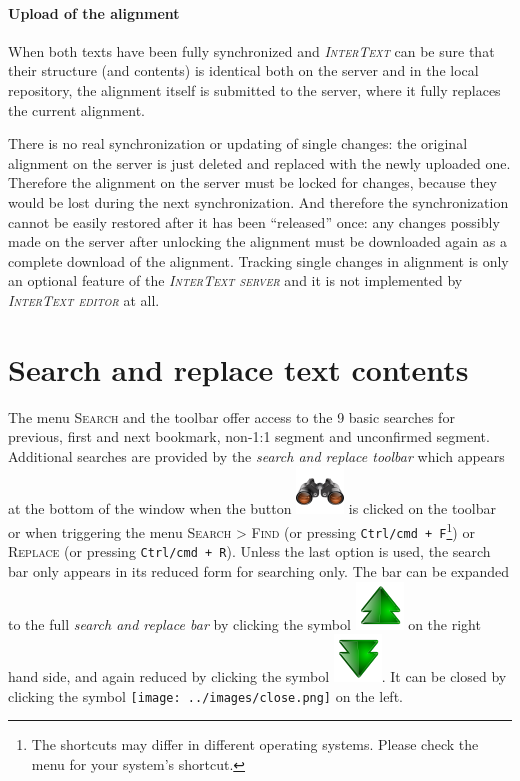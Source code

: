 \documentclass[a4paper,10pt,oneside]{book}
\newcommand{\IT}{\textit{\textsc{InterText}}\xspace}
\newcommand{\ITeditor}{\textit{\textsc{InterText editor}}\xspace}
\newcommand{\ITserver}{\textit{\textsc{InterText server}}\xspace}
\newcommand{\keys}[1]{\texttt{#1}}
\newcommand{\menu}[1]{\textsc{#1}}
\begin{document}
\subsubsection{Upload of the alignment}\label{ch:detail:managing_remote:sync:alupload}

When both texts have been fully synchronized and \IT can be sure that their structure (and contents) is identical both on the server and in the local repository, the alignment itself is submitted to the server, where it fully replaces the current alignment.

There is no real synchronization or updating of single changes: the original alignment on the server is just deleted and replaced with the newly uploaded one. Therefore the alignment on the server must be locked for changes, because they would be lost during the next synchronization. And therefore the synchronization cannot be easily restored after it has been ``released'' once: any changes possibly made on the server after unlocking the alignment must be downloaded again as a complete download of the alignment. Tracking single changes in alignment is only an optional feature of the \ITserver and it is not implemented by \ITeditor at all.

\chapter{Search and replace text contents}\label{ch:detail:search_replace}

The menu \menu{Search} and the toolbar offer access to the 9 basic searches for previous, first and next bookmark, non-1:1 segment and unconfirmed segment. Additional searches are provided by the \emph{search and replace toolbar} which appears at the bottom of the window when the button \includegraphics[height=2ex]{../images/48/search.png} is clicked on the toolbar or when triggering the menu \menu{Search} > \menu{Find} (or pressing \keys{Ctrl/cmd + F}\footnote{The shortcuts may differ in different operating systems. Please check the menu for your system's shortcut.}) or \menu{Replace} (or pressing \keys{Ctrl/cmd + R}). Unless the last option is used, the search bar only appears in its reduced form for searching only. The bar can be expanded to the full \emph{search and replace bar} by clicking the symbol \includegraphics[height=2ex]{../images/48/arrow-up-double.png} on the right hand side, and again reduced by clicking the symbol \includegraphics[height=2ex]{../images/48/arrow-down-double.png}. It can be closed by clicking the symbol \texttt{[image: ../images/close.png]} on the left.
\end{document}
